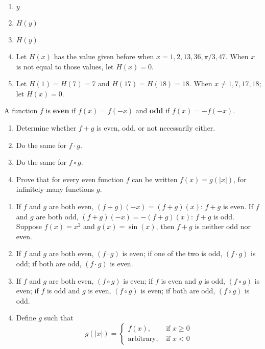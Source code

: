 \begin{solution}
  \begin{enumerate}[label = (\alph*)]
    \item $y$
    \item $H(y)$
    \item $H(y)$
    \item Let $H(x)$ has the value given before when $x = 1,2,13,36,\pi/3,47$.
    When $x$ is not equal to those values, let $H(x) = 0$.
    \item Let $H(1) = H(7) = 7$ and $H(17) = H(18) = 18$. When $x \neq 1,7,17,18$;
    let $H(x) = 0$.
  \end{enumerate}
\end{solution}

\begin{pr} \label{3.12}
  A function $f$ is \textbf{even} if $f(x) = f(-x)$ and \textbf{odd} if $f(x) = -f(-x)$.
  \begin{enumerate}[label = (\alph*)]
    \item Determine whether $f + g$ is even, odd, or not necessarily either.
    \item Do the same for $f \cdot g$.
    \item Do the same for $f \circ g$.
    \item Prove that for every even function $f$ can be written $f(x) = g(|x|)$,
    for infinitely many functions $g$.
  \end{enumerate}
\end{pr}

\begin{solution}
  \begin{enumerate}[label = (\alph*)]
    \item If $f$ and $g$ are both even, $(f + g)(-x) = (f + g)(x)$: $f + g$ is even.
    If $f$ and $g$ are both odd, $(f + g)(-x) = -(f + g)(x)$: $f + g$ is odd.
    Suppose $f(x) = x^2$ and $g(x) = \sin (x)$, then $f + g$ is neither odd nor even.
    \item If $f$ and $g$ are both even, $(f \cdot g)$ is even; if one of the two
    is odd, $(f \cdot g)$ is odd; if both are odd, $(f \cdot g)$ is even.
    \item If $f$ and $g$ are both even, $(f \circ g)$ is even; if $f$ is even
    and $g$ is odd, $(f \circ g)$ is even; if $f$ is odd and $g$ is even,
    $(f \circ g)$ is even; if both are odd, $(f \circ g)$ is odd.
    \item Define $g$ such that
    \begin{equation*}
      g(|x|) = \left\{
      \begin{array}{rl}
        f(x), & \text{ if } x \geq 0 \\
        \text{arbitrary}, & \text{ if } x < 0
      \end{array}
      \right.
    \end{equation*}
  \end{enumerate}
\end{solution}

